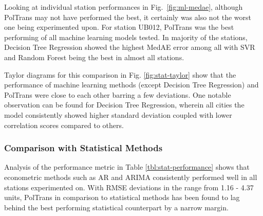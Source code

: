 \documentclass[10pt,journal]{IEEEtran}
\begin{document}
Looking at individual station performances in Fig.~\ref{fig:ml-medae}, although {PolTrans} may not have performed the best, it certainly was also not the worst one being experimented upon. For station UB012, {PolTrans} was the best performing of all machine learning models tested. In majority of the stations, Decision Tree Regression showed the highest MedAE error among all with SVR and Random Forest being the best in almost all stations.

Taylor diagrams for this comparison in Fig. \ref{fig:stat-taylor} show that the performance of machine learning methods (except Decision Tree Regression) and {PolTrans} were close to each other barring a few deviations. One notable observation can be found for Decision Tree Regression, wherein all cities the model consistently showed higher standard deviation coupled with lower correlation scores compared to others.

\subsubsection{Comparison with Statistical Methods}

Analysis of the performance metric in Table \ref{tbl:stat-performance} shows that econometric methods such as AR and ARIMA consistently performed well in all stations experimented on. With RMSE deviations in the range from 1.16 - 4.37 units, {PolTrans} in comparison to statistical methods has been found to lag behind the best performing statistical counterpart by a narrow margin.
\end{document}
